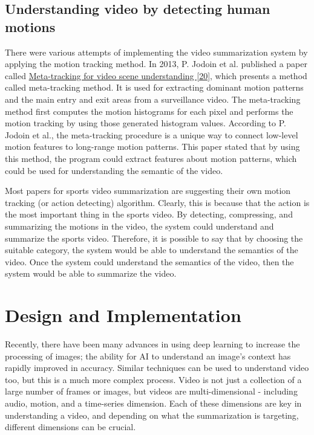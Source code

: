 \documentclass{article}
\begin{document}
\subsection{Understanding video by detecting human motions}

There were various attempts of implementing the video summarization system by applying the motion tracking method. In 2013, P. Jodoin et al. published a paper called \hyperlink{ref20}{Meta-tracking for video scene understanding [20]}, which presents a method called meta-tracking method. It is used for extracting dominant motion patterns and the main entry and exit areas from a surveillance video. The meta-tracking method first computes the motion histograms for each pixel and performs the motion tracking by using those generated histogram values. According to P. Jodoin et al., the meta-tracking procedure is a unique way to connect low-level motion features to long-range motion patterns. This paper stated that by using this method, the program could extract features about motion patterns, which could be used for understanding the semantic of the video.

Most papers for sports video summarization are suggesting their own motion tracking (or action detecting) algorithm. Clearly, this is because that the action is the most important thing in the sports video. By detecting, compressing, and summarizing the motions in the video, the system could understand and summarize the sports video. Therefore, it is possible to say that by choosing the suitable category, the system would be able to understand the semantics of the video. Once the system could understand the semantics of the video, then the system would be able to summarize the video.

\section{Design and Implementation}

Recently, there have been many advances in using deep learning to increase the processing of images; the ability for AI to understand an image’s context has rapidly improved in accuracy. Similar techniques can be used to understand video too, but this is a much more complex process. Video is not just a collection of a large number of frames or images, but videos are multi-dimensional - including audio, motion, and a time-series dimension. Each of these dimensions are key in understanding a video, and depending on what the summarization is targeting, different dimensions can be crucial.
\end{document}

